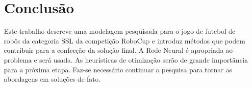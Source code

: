 \chapter{Conclusão}\label{cap:conclusao}

Este trabalho descreve uma modelagem pesquisada para o jogo de futebol de robôs da
categoria SSL da competição RoboCup e introduz métodos que podem
contribuir para a confecção da solução final.
A Rede Neural é apropriada ao problema e será usada.
As heurísticas de otimização serão de grande importância para a próxima etapa.
Faz-se necessário continuar a pesquisa para tornar as abordagens em soluções de fato.
